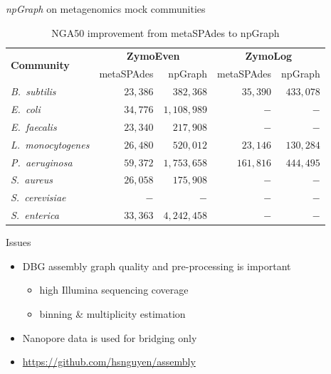 \documentclass{beamer}
\begin{document}
\begin{frame}{\emph{npGraph} on metagenomics mock communities}
\begin{table}[ht]
\begin{center}
\caption{NGA50 improvement from metaSPAdes to npGraph}
\begin{tabular}{|l|r|r|r|r|}
\hline
\multirow{2}{*}{\textbf{Community}} & \multicolumn{2}{|c|}{\textbf{ZymoEven}} & \multicolumn{2}{|c|}{\textbf{ZymoLog}} \\ \cline{2-5}
& metaSPAdes & npGraph & metaSPAdes & npGraph \\ \hline
\emph{B.~subtilis} & $23,386$ & $382,368$ & $35,390$ & $433,078$ \\ \hline
\emph{E.~coli} & $34,776$ & $1,108,989$ & $-$ & $-$ \\ \hline
\emph{E.~faecalis} & $23,340$ & $217,908$ & $-$ & $-$ \\ \hline
\emph{L.~monocytogenes} & $26,480$ & $520,012$ & $23,146$ & $130,284$ \\ \hline
\emph{P.~aeruginosa} & $59,372$ & $1,753,658$ & $161,816$ & $444,495$ \\ \hline
\emph{S.~aureus} & $26,058$ & $175,908$ & $-$ &$-$ \\ \hline
\emph{S.~cerevisiae} & $-$ & $-$ & $-$ & $-$ \\ \hline
\emph{S.~enterica} & $33,363$ & $4,242,458$ & $-$ & $-$ \\ \hline
\end{tabular}
\end{center}
\end{table}

\end{frame}
\begin{frame}{Issues}
\begin{itemize}
\item DBG assembly graph quality and pre-processing is important 
	\begin{itemize}
		\item high Illumina sequencing coverage
		\item binning \& multiplicity estimation
	\end{itemize}
\item Nanopore data is used for bridging only
\item \url{https://github.com/hsnguyen/assembly}
\end{itemize}
\end{frame}
\end{document}
